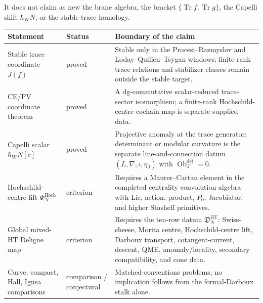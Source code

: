 \documentclass[11pt]{memoir}
\begin{document}
  It does not claim as new the brane algebra, the bracket
  \(\{\operatorname{Tr}f,\operatorname{Tr}g\}\), the Capelli shift
  \(\hbar_{\mathrm{W}}N\), or the stable trace homology.

  \medskip\noindent
  \label{tab:intro-theorem-status}
  \begin{center}
  \small
  \renewcommand{\arraystretch}{1.14}
  \begin{tabularx}{\textwidth}{@{}>{\raggedright\arraybackslash}p{}
    >{\raggedright\arraybackslash}p{}
    >{\raggedright\arraybackslash}X@{}}
    \textbf{Statement} & \textbf{Status} & \textbf{Boundary of the claim}\\\hline
    Stable trace coordinate \(J(f)\) & proved &
      Stable only in the Procesi--Razmyslov and Loday--Quillen--Tsygan
      windows; finite-rank trace relations and stabilizer classes remain
      outside the stable target.\\
    CE/PV coordinate theorem & proved &
      A dg-commutative scalar-reduced trace-sector isomorphism; a
      finite-rank Hochschild-centre cochain map is separate supplied data.\\
    Capelli scalar \(\hbar_{\mathrm{W}}N[\bar c]\) & proved &
      Projective anomaly at the trace generator; determinant or modular
      curvature is the separate line-and-connection datum
      \((L,\nabla,\iota,\eta_J)\) with
      \(\operatorname{Ob}^{\det}_J=0\).\\
    Hochschild-centre lift \(\Phi_N^{\mathrm{Hoch}}\) & criterion &
      Requires a Maurer--Cartan element in the completed centrality
      convolution algebra with Lie, action, product, \(P_0\), Jacobiator,
      and higher Stasheff primitives.\\
    Global mixed-HT Deligne map & criterion &
      Requires the ten-row datum \(\mathfrak D^{\mathrm{HT}}_N\):
      Swiss-cheese, Morita centre, Hochschild-centre lift, Darboux
      transport, cotangent-current, descent, QME, anomaly/locality,
      secondary compatibility, and cone data.\\
    Curve, compact, Hall, Igusa comparisons & comparison / conjectural &
      Matched-conventions problems; no implication follows from the
      formal-Darboux stalk alone.
  \end{tabularx}
  \end{center}
\end{document}
